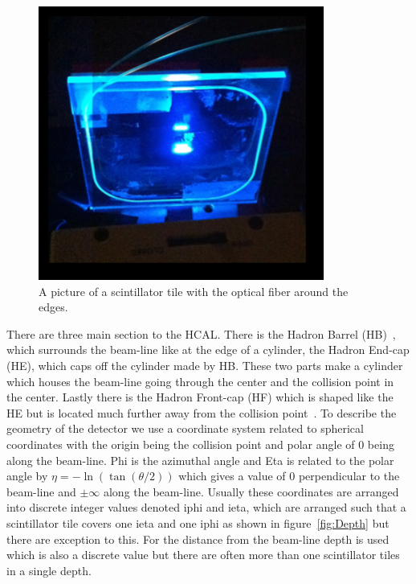 \begin{figure}
\centering
\includegraphics[width=0.6\linewidth]{Figures/Tile.png}
\caption{A picture of a scintillator tile with the optical fiber around the edges.}
\label{fig:Tile}
\end{figure}


There are three main section to the HCAL. There is the Hadron Barrel (HB)~\cite{HB}, which surrounds the beam-line like at the edge of a cylinder, the Hadron End-cap (HE), which caps off the cylinder made by HB. These two parts make a cylinder which houses the beam-line going through the center and the collision point in the center. Lastly there is the Hadron Front-cap (HF) which is shaped like the HE but is located much further away from the collision point~\cite{HF}. To describe the geometry of the detector we use a coordinate system related to spherical coordinates with the origin being the collision point and polar angle of 0 being along the beam-line. Phi is the azimuthal angle and Eta is related to the polar angle by $\eta = -\ln(\tan(\theta/2))$ which gives a value of 0 perpendicular to the beam-line and $\pm\infty$ along the beam-line. Usually these coordinates are arranged into discrete integer values denoted iphi and ieta, which are arranged such that a scintillator tile covers one ieta and one iphi as shown in figure~\ref{fig:Depth} but there are exception to this. For the distance from the beam-line depth is used which is also a discrete value but there are often more than one scintillator tiles in a single depth. 


